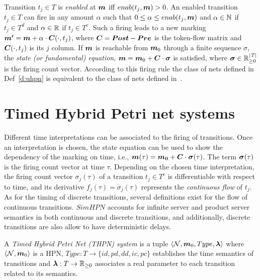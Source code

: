 Transition $t_j \in T$ is \emph{enabled} at $\b{m}$ iff $enab(t_j,\b{m})>0$.
An enabled transition $t_j \in T$ can fire in any amount $\alpha$ such that
\mbox{$0 \leq \alpha \leq enab(t_j,\b{m})$} and $\alpha\in\mathbb{N}$ if $t_j \in T^d$
and \mbox{$\alpha\in\mathbb{R}$} if $t_j \in T^c$. Such a firing leads to a
new marking \mbox{$\b{m'} = \b{m} + \alpha \cdot \C(\cdot,t_j)$}, where $\C = \Post
- \Pre$ is the token-flow matrix and $\C(\cdot,t_j)$ is its $j$ column. If $\b{m}$ is reachable from
$\b{m}_0$ through a finite sequence $\sigma$, the \emph{state (or
fundamental) equation}, $\b{m} =\b{m}_0
+\C \cdot \b{\sigma}$ is satisfied, where $\b{\sigma} \in \rea^{|\mathit{T}|}_{\geq 0}$
is the firing count vector. According to this firing rule the class of nets defined
in Def~\ref{d:uhpn} is equivalent to the class of nets defined in~\cite{BODavid10,ARBaMeGi00}.


\section{Timed Hybrid Petri net  systems}
\label{s:timedHPN}

Different time interpretations can be associated to the firing of transitions.
Once an interpretation is chosen, the state equation can be used to show
the dependency of the marking on time, i.e., $\b{m}(\tau) = \b{m_0} + \C \cdot
\b{\sigma}(\tau)$. The term $\b{\sigma}(\tau)$ is the firing count vector
at time $\tau$. Depending on the chosen time interpretation, the firing
count vector $\sigma_j(\tau)$ of a transition $t_j \in T^c$ is differentiable
with respect to time, and its derivative $f_j(\tau)=\dot{\sigma_j}(\tau)$
represents the \emph{continuous flow} of $t_j$. As for the timing of
discrete transitions, several definitions exist for the flow of continuous
transitions. $SimHPN$ accounts for infinite server and product server semantics
in both continuous and discrete transitions, and additionally, discrete transitions
are also allow to have deterministic delays.

\begin{defn}
\label{d:thpn}
A \emph{Timed Hybrid Petri Net (THPN) system} is a tuple $\langle \N, \b{m}_0, Type, \b{\lambda} \rangle$
where $\langle \N, \b{m}_0\rangle$ is a HPN, $Type:T\rightarrow \{id,pd,dd,ic,pc\}$ establishes the time
semantics of transitions and $\b{\lambda}:T\rightarrow \rea_{\geq 0}$ associates a real parameter to each
transition related to its semantics.
\end{defn}

